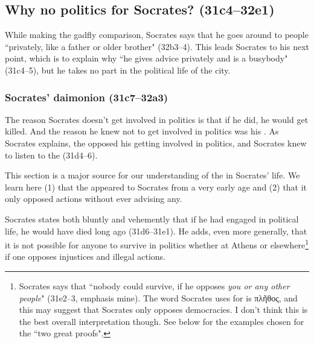 \documentclass[11pt]{article}
\begin{document}

\subsection{Why no politics for Socrates? (31c4--32e1)}

While making the gadfly comparison, Socrates says that he goes around to
people ``privately, like a father or older brother" (32b3--4).  This leads
Socrates to his next point, which is to explain why ``he gives advice
privately and is a busybody" (31c4--5), but he takes no part in the
political life of the city.


\subsubsection{Socrates' daimonion (31c7--32a3)}

The reason Socrates doesn't get involved in politics is that if he did, he
would get killed.  And the reason he knew not to get involved in politics
was his .  As Socrates explains, the 
opposed his getting involved in politics, and Socrates knew to listen to
the  (31d4--6).

This section is a major source for our understanding of the
 in Socrates' life.  We learn here (1) that the
 appeared to Socrates from a very early age and (2) that
it only opposed actions without ever advising any.

Socrates states both bluntly and vehemently that if he had engaged in
political life, he would have died long ago (31d6--31e1).  He adds, even
more generally, that it is not possible for anyone to survive in politics
whether at Athens or elsewhere\footnote{Socrates says that ``nobody could
survive, if he opposes \emph{you or any other people}" (31e2--3,
emphasis mine).  The word Socrates uses for  is {\g
πλῆθος}, and this may suggest that Socrates only opposes democracies.
I don't think this is the best overall interpretation though.  See below
for the examples chosen for the ``two great proofs".} if one opposes
injustices and illegal actions.


\end{document}
